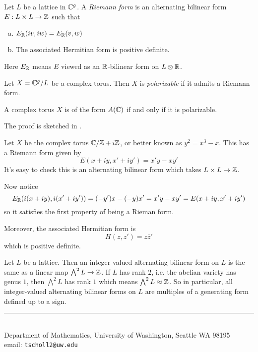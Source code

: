\documentclass[11pt]{article}
\makeatletter
\newcommand{\myauthor}{Travis Scholl}
\newcommand{\myemail}{tscholl2@uw.edu}
\makeatother
\begin{document}
\begin{defn}
	Let $L$ be a lattice in $\mathbb{C}^g$. A \emph{Riemann form} is an alternating bilinear form $E:L \times L \to \mathbb{Z}$ such that
	\begin{enumerate}[(a)]
		\item $E_{\mathbb{R}}(iv,iw) = E_{\mathbb{R}}(v,w)$
		\item The associated Hermitian form is positive definite.
	\end{enumerate}
	Here $E_{\mathbb{R}}$ means $E$ viewed as an $\mathbb{R}$-bilinear form on $L\otimes\mathbb{R}$.
\end{defn}

\begin{defn}
	Let $X = \mathbb{C}^g/L$ be a complex torus. Then $X$ is \emph{polarizable} if it admits a Riemann form.
\end{defn}

\begin{thm}\label{thm:polarizable}
	A complex torus $X$ is of the form $A(\mathbb{C})$ if and only if it is polarizable.
\end{thm}

The proof is sketched in \cite[Thm.~2.8]{milneAV}.

\begin{ex}
	Let $X$ be the complex torus $\mathbb{C}/\mathbb{Z}+ i\mathbb{Z}$, or better known as $y^2 = x^3 - x$. This has a Riemann form given by
	$$
	E(x+iy,x'+iy') = x'y - xy'
	$$
	It's easy to check this is an alternating bilinear form which takes $L\times L \to \mathbb{Z}$. 
	
	Now notice
	$$
	E_{\mathbb{R}}(i(x+iy),i(x'+iy')) = (-y')x - (-y)x' = x'y - xy' = E(x+iy,x'+iy')
	$$
	so it satisfies the first property of being a Rieman form.
	
	Moreover, the associated Hermitian form is
	$$
	H(z,z') = z\overline{z}'
	$$
	which is positive definite.
\end{ex}

\begin{rem}
	Let $L$ be a lattice. Then an integer-valued alternating bilinear form on $L$ is the same as a linear map $\bigwedge^2 L\to \mathbb{Z}$. If $L$ has rank $2$, i.e. the abelian variety has genus $1$, then $\bigwedge^2 L$ has rank $1$ which means $\bigwedge^2 L \approx \mathbb{Z}$. So in particular, all integer-valued alternating bilinear forms on $L$ are multiples of a generating form defined up to a sign.
\end{rem}






\begin{center}
\noindent\rule{4cm}{.5pt}
\vspace{.25cm}

\noindent {\sc \small \myauthor}\\
{\small Department of Mathematics, University of Washington, Seattle WA 98195} \\
email: {\tt \myemail}
\end{center}
\end{document}
